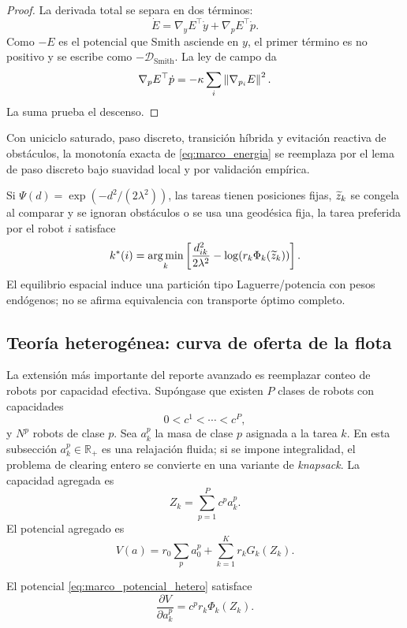 \begin{proof}
La derivada total se separa en dos términos:
\[
  \dot E=\nabla_yE^\top\dot y+\nabla_pE^\top\dot p.
\]
Como $-E$ es el potencial que Smith asciende en $y$, el primer término es no positivo y
se escribe como $-\mathcal{D}_{\mathrm{Smith}}$. La ley de campo da
\[
  \nabla_pE^\top\dot p
  =
  -\kappa\sum_i\left\|\nabla_{p_i}E\right\|^2.
\]
La suma prueba el descenso.
\end{proof}

Con uniciclo saturado, paso discreto, transición híbrida y evitación reactiva de
obstáculos, la monotonía exacta de \eqref{eq:marco_energia} se reemplaza por el lema de
paso discreto bajo suavidad local y por validación empírica.

\begin{corolario}
Si $\Psi(d)=\exp(-d^2/(2\lambda^2))$, las tareas tienen posiciones fijas, $\widetilde{z}_k$ se
congela al comparar y se ignoran obstáculos o se usa una geodésica fija, la tarea
preferida por el robot $i$ satisface
\[
  k^*(i)=
  \operatorname*{arg\,min}_k
  \left[
    \frac{d_{ik}^2}{2\lambda^2}
    -
    \log(r_k\Phi_k(\widetilde{z}_k))
  \right].
\]
El equilibrio espacial induce una partición tipo Laguerre/potencia con pesos endógenos;
no se afirma equivalencia con transporte óptimo completo.
\end{corolario}

\subsection{Teoría heterogénea: curva de oferta de la flota}

La extensión más importante del reporte avanzado es reemplazar conteo de robots por
capacidad efectiva. Supóngase que existen $P$ clases de robots con capacidades
\[
  0<c^1<\cdots<c^P,
\]
y $N^p$ robots de clase $p$. Sea $a_k^p$ la masa de clase $p$ asignada a la tarea $k$.
En esta subsección $a_k^p\in\mathbb{R}_+$ es una relajación fluida; si se impone
integralidad, el problema de clearing entero se convierte en una variante de
\emph{knapsack}.
La capacidad agregada es
\[
  Z_k=\sum_{p=1}^{P}c^p a_k^p.
\]
El potencial agregado es
\begin{equation}
  V(a)=r_0\sum_p a_0^p+\sum_{k=1}^{K}r_kG_k(Z_k).
  \label{eq:marco_potencial_hetero}
\end{equation}

\begin{lema}
El potencial \eqref{eq:marco_potencial_hetero} satisface
\[
  \frac{\partial V}{\partial a_k^p}=c^p r_k\Phi_k(Z_k).
\]
\end{lema}

